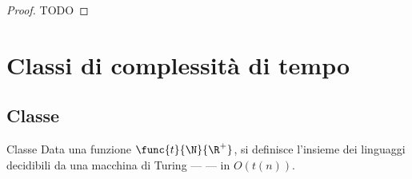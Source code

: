 \documentclass[a4paper, 12pt]{report}
\begin{document}
    \begin{proof}
        TODO
    \end{proof}

    \section{Classi di complessità di tempo}

    \subsection{Classe \DTIME}

    \begin{frameddefn}{Classe \DTIME}
        Data una funzione $\func{t}{\N}{\R^+}$, si definisce  l'insieme dei linguaggi decidibili da una macchina di Turing ---  --- in $O(t(n))$.
    \end{frameddefn}
\end{document}
